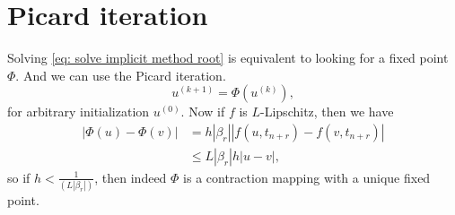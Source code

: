 \section{Picard iteration}
Solving \eqref{eq: solve implicit method root} is equivalent to looking for a fixed point $ \Phi $. And we can use the Picard iteration. 
\[
    u^{(k+1)} = \Phi (u^{(k)}), 
\] 
for arbitrary initialization $ u^{(0)} $. Now if $ f $ is $ L $-Lipschitz, then we have 
\[
    \begin{aligned}
        |\Phi(u)-\Phi(v)| & =h\left|\beta_r\right|\left|f\left(u, t_{n+r}\right)-f\left(v, t_{n+r}\right)\right| \\
        & \leq L\left|\beta_r\right| h|u-v|,
        \end{aligned}
\]
 so if $ h<\frac{1}{(L|\beta _r|)} $, then indeed $ \Phi $ is a contraction mapping with a unique fixed point. 

 
